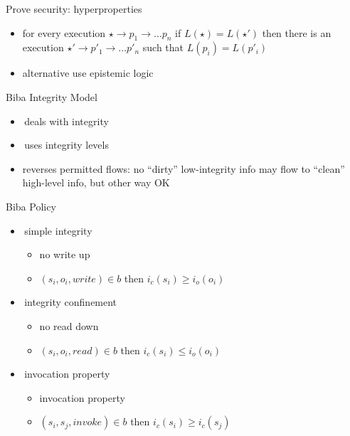 \documentclass{beamer}
\begin{document}
\begin{frame}[fragile]{Prove security: hyperproperties}
  \begin{itemize}
  \item for every execution $\star \rightarrow p_1 \rightarrow \dots p_n$
    if $L(\star) = L(\star')$  then there is an execution
    $\star' \rightarrow p'_1 \rightarrow \dots p'_n$
  such that $L(p_i) = L(p'_i)$
  \item alternative use epistemic logic
  \end{itemize}
\end{frame}

\begin{frame}{Biba Integrity Model}
  \begin{itemize}
    \item deals with integrity
    \item uses integrity levels
    \item reverses permitted flows: 
      no ``dirty'' low-integrity info may flow to ``clean'' 
      high-level info, but other way OK
  \end{itemize}
\end{frame}

\begin{frame}{Biba Policy}
  \begin{itemize}
    \item simple integrity
      \begin{itemize}
      \item no write up
      \item $(s_i, o_i, write) \in b$ then
        $i_c(s_i) \ge i_o(o_i)$
      \end{itemize}
    \item integrity confinement
      \begin{itemize}
      \item no read down
      \item $(s_i, o_i, read) \in b$ then
        $i_c(s_i) \le i_o(o_i)$
      \end{itemize}
    \item invocation property
      \begin{itemize}
      \item invocation property
      \item $(s_i, s_j, invoke) \in b$ then
        $i_c(s_i) \ge i_c(s_j)$
      \end{itemize}
  \end{itemize}
\end{frame}
\end{document}

